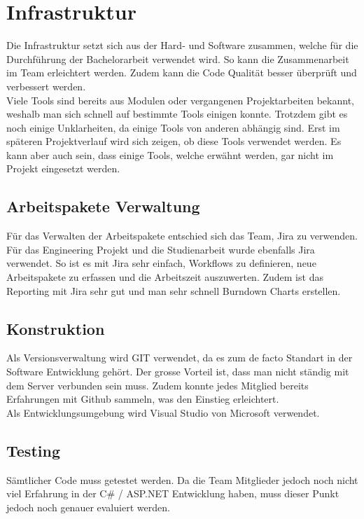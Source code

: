 \section{Infrastruktur}
Die Infrastruktur setzt sich aus der Hard- und Software zusammen, welche für die Durchführung der Bachelorarbeit verwendet wird. So kann die Zusammenarbeit im Team erleichtert werden. Zudem kann die Code Qualität besser überprüft und verbessert werden.
\\
Viele Tools sind bereits aus Modulen oder vergangenen Projektarbeiten bekannt, weshalb man sich schnell auf bestimmte Tools einigen konnte. Trotzdem gibt es noch einige Unklarheiten, da einige Tools von anderen abhängig sind. Erst im späteren Projektverlauf wird sich zeigen, ob diese Tools verwendet werden. Es kann aber auch sein, dass einige Tools, welche erwähnt werden, gar nicht im Projekt eingesetzt werden.

\subsection{Arbeitspakete Verwaltung}
Für das Verwalten der Arbeitspakete entschied sich das Team, Jira zu verwenden. Für das Engineering Projekt und die Studienarbeit wurde ebenfalls Jira verwendet. So ist es mit Jira sehr einfach, Workflows zu definieren, neue Arbeitspakete zu erfassen und die Arbeitszeit auszuwerten. Zudem ist das Reporting mit Jira sehr gut und man sehr schnell Burndown Charts erstellen.

\subsection{Konstruktion}
Als Versionsverwaltung wird GIT verwendet, da es zum de facto Standart in der Software Entwicklung gehört. Der grosse Vorteil ist, dass man nicht ständig mit dem Server verbunden sein muss. Zudem konnte jedes Mitglied bereits Erfahrungen mit Github sammeln, was den Einstieg erleichtert.
\\
Als Entwicklungsumgebung wird Visual Studio von Microsoft verwendet.

\subsection{Testing}
Sämtlicher Code muss getestet werden. Da die Team Mitglieder jedoch noch nicht viel Erfahrung in der C\# / ASP.NET Entwicklung haben, muss dieser Punkt jedoch noch genauer evaluiert werden.

